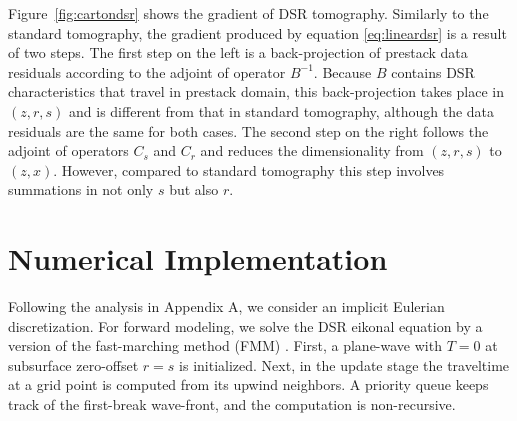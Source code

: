 Figure~\ref{fig:cartondsr} shows the gradient of DSR tomography. Similarly to the standard tomography, the 
gradient produced by equation \ref{eq:lineardsr} is a result of two steps. The first step on the left is a 
back-projection of prestack data residuals according to the adjoint of operator $B^{-1}$. Because $B$ contains 
DSR characteristics that travel in prestack domain, this back-projection takes place in $(z,r,s)$ and is 
different from that in standard tomography, although the data residuals are the same for both cases. The second 
step on the right follows the adjoint of operators $C_s$ and $C_r$ and reduces the dimensionality from $(z,r,s)$ 
to $(z,x)$. However, compared to standard tomography this step involves summations in not only $s$ but also $r$.

\section{Numerical Implementation}

Following the analysis in Appendix A, we consider an implicit Eulerian discretization. For forward 
modeling, we solve the DSR eikonal equation by a version of the fast-marching method (FMM) \cite[]{sethian}. 
First, a plane-wave with $T = 0$ at subsurface zero-offset $r = s$ is initialized. Next, in the update stage the 
traveltime at a grid point is computed from its upwind neighbors. A priority queue keeps track of the first-break 
wave-front, and the computation is non-recursive.

